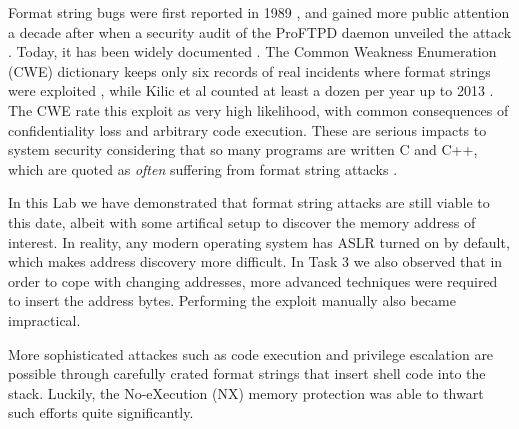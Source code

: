 
Format string bugs were first reported in 1989 \cite{Miller1990}, and gained more public attention a decade after when a security audit of the ProFTPD daemon unveiled the attack \cite{tymm1999}. Today, it has been widely documented \cite{fsa_owasp, Weitz2014, Shankar2001, cowan2002, arbaugh1997automated, scut2001}. The Common Weakness Enumeration (CWE) dictionary keeps only six records of real incidents where format strings were exploited \cite{fsa_cwe}, while Kilic et al counted at least a dozen per year up to 2013 \cite{Kilic2015}. The CWE rate this exploit as very high likelihood, with common consequences of confidentiality loss and arbitrary code execution. These are serious impacts to system security considering that so many programs are written C and C++, which are quoted as \emph{often} suffering from format string attacks \cite{fsa_cwe}.

In this Lab we have demonstrated that format string attacks are still viable to this date, albeit with some artifical setup to discover the memory address of interest. In reality, any modern operating system has ASLR turned on by default, which makes address discovery more difficult. In Task 3 we also observed that in order to cope with changing addresses, more advanced techniques were required to insert the address bytes.  Performing the exploit manually also became impractical.

More sophisticated attackes such as code execution and privilege escalation are possible through carefully crated format strings that insert shell code into the stack. Luckily, the No-eXecution (NX) memory protection was able to thwart such efforts quite significantly.


